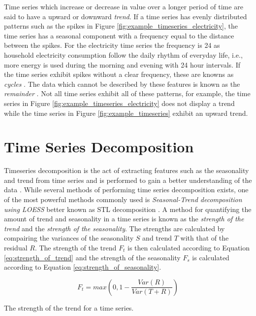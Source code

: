 Time series which increase or decrease in value over a longer period of time are said to have a upward or downward \textit{trend}. If a time series has evenly distributed patterns such as the spikes in Figure \ref{fig:example_timeseries_electricity}, the time series has a seasonal component with a frequency equal to the distance between the spikes. For the electricity time series the frequency is 24 as household electricity consumption follow the daily rhythm of everyday life, i.e., more energy is used during the morning and evening with 24 hour intervals. If the time series exhibit spikes without a clear frequency, these are knowns as \textit{cycles} \cite{bauer2021libra}. The data which cannot be described by these features is known as the \textit{remainder} \cite{hyndman_forecasting_3rd}. Not all time series exhibit all of these patterns, for example, the time series in Figure \ref{fig:example_timeseries_electricity} does not display a trend while the time series in Figure \ref{fig:example_timeseries} exhibit an upward trend.

\section{Time Series Decomposition}
\label{sec:time_series_decomposition}
Timeseries decomposition is the act of extracting features such as the seasonality and trend from time series and is performed to gain a better understanding of the data \cite{hyndman_forecasting_3rd}. While several methods of performing time series decomposition exists, one of the most powerful methods commonly used is \textit{Seasonal-Trend decomposition using LOESS} better known as STL decomposition \cite{hyndman_forecasting_3rd}. A method for quantifying the amount of trend and seasonality in a time series is known as the \textit{strength of the trend} and the \textit{strength of the seasonality}. The strengths are calculated by compairing the variances of the seasonality \(S\) and trend \(T\) with that of the residual \(R\). The strength of the trend \(F_t\) is then calculated according to Equation \ref{eq:strength_of_trend} and the strength of the seasonality \(F_s\) is calculated according to Equation \ref{eq:strength_of_seasonality}.

\begin{eqfloat}
  \begin{equation}
    F_t = max(0,1-\frac{Var(R)}{Var(T + R)})
    \label{eq:strength_of_trend}
  \end{equation}
  \caption{The strength of the trend for a time series.}
\end{eqfloat}


